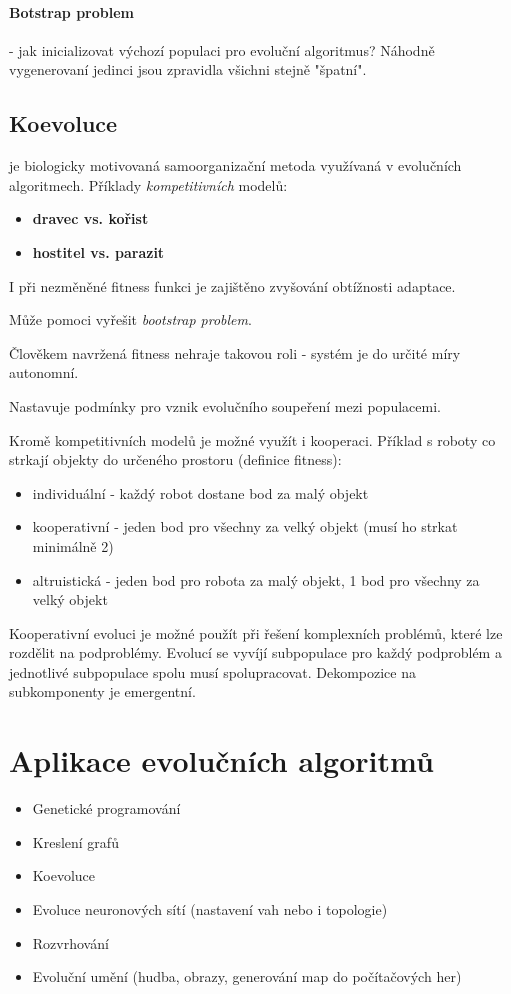\documentclass[a4paper]{article}      %
\begin{document}
\paragraph{Botstrap problem} - jak inicializovat výchozí populaci pro evoluční algoritmus?
Náhodně vygenerovaní jedinci jsou zpravidla všichni stejně "špatní".

\subsection{Koevoluce} je biologicky motivovaná samoorganizační metoda využívaná v evolučních algoritmech.
Příklady \emph{kompetitivních} modelů:
\begin{itemize}
\item \textbf{dravec vs. kořist}
\item \textbf{hostitel vs. parazit}
\end{itemize}
I při nezměněné fitness funkci je zajištěno zvyšování obtížnosti adaptace.

Může pomoci vyřešit \emph{bootstrap problem}.

Člověkem navržená fitness nehraje takovou roli - systém je do určité míry autonomní.

Nastavuje podmínky pro vznik evolučního soupeření mezi populacemi.

Kromě kompetitivních modelů je možné využít i kooperaci. Příklad s roboty co strkají objekty do určeného prostoru (definice fitness):
\begin{itemize}
\item individuální - každý robot dostane bod za malý objekt
\item kooperativní - jeden bod pro všechny za velký objekt (musí ho strkat minimálně 2)
\item altruistická - jeden bod pro robota za malý objekt, 1 bod pro všechny za velký objekt
\end{itemize}
Kooperativní evoluci je možné použít při řešení komplexních problémů, které lze rozdělit na podproblémy.
Evolucí se vyvíjí subpopulace pro každý podproblém a jednotlivé subpopulace spolu musí spolupracovat.
Dekompozice na subkomponenty je emergentní.


\section{Aplikace evolučních algoritmů}

\begin{itemize}
\item Genetické programování
\item Kreslení grafů
\item Koevoluce
\item Evoluce neuronových sítí (nastavení vah nebo i topologie)
\item Rozvrhování
\item Evoluční umění (hudba, obrazy, generování map do počítačových her)
\end{itemize}
\end{document}
